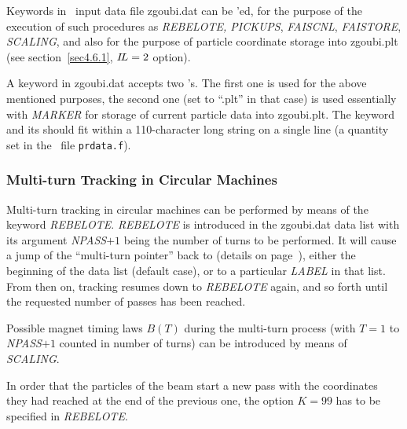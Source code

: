 Keywords in \zgou\ input data file zgoubi.dat can be \LABEL'ed, for the purpose of 
the execution of such procedures as  \textsl{REBELOTE,  PICKUPS}, 
\textsl{FAISCNL}, \textsl{FAISTORE}, 
 \textsl{SCALING}, and also for the purpose of 
particle coordinate storage into zgoubi.plt (see section~\ref{sec4.6.1}, 
$I\!L=2$ option). 

\medskip 

\noindent A keyword in zgoubi.dat accepts two \LABEL's. The first one is used for the 
above mentioned purposes, the second one (set to ``.plt'' in that case) is used essentially 
 with \textsl{MARKER} for storage of current particle data 
into zgoubi.plt. The keyword and its \LABEL['s] should fit within a 110-character 
long string on a single line (a quantity set in the \FORTRAN\ file \texttt{prdata.f}). 

\subsubsection{Multi-turn Tracking in Circular Machines \label{sec4.6.5} } 

Multi-turn tracking  in circular machines can be performed by
means of the keyword \textsl{REBELOTE}. \textsl{REBELOTE} is introduced in 
the  zgoubi.dat data list with its argument \textsl{NPASS}$+1$ being the number of turns to be 
performed. 
It will cause a jump of  the ``multi-turn pointer''  back to (details on page~\pageref{REBELOTE}), 
either the beginning of the data list (default case), or to a particular \textsl{LABEL} 
in that list. From then on, tracking resumes down to \textsl{REBELOTE} again, and so forth until the 
requested number of passes has been reached. 

\medskip

\noindent Possible magnet  timing laws $ B(T)$  during the multi-turn process 
(with $T=1 $ to \textsl{NPASS}$+1$  counted in number of turns) can be introduced by means of \textsl{SCALING}. 

\medskip 

\noindent In order that the \IMAX{} particles of the beam start a new 
pass with the coordinates they had reached at the end of the 
previous one, the option $ K=99 $ has to be specified in \textsl{REBELOTE}.

\medskip


